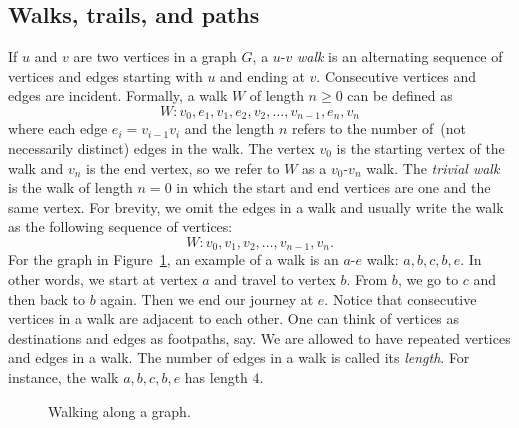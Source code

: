 
\subsection{Walks, trails, and paths}
\label{subsec:introduction:walks_trails_paths}

If $u$ and $v$ are two vertices in a graph $G$, a $u$-$v$ \emph{walk}
is an alternating sequence of vertices and edges starting with $u$ and
ending at $v$. Consecutive vertices and edges are incident. Formally,
a walk $W$ of length $n \geq 0$ can be defined as
\[
W: v_0, e_1, v_1, e_2, v_2, \dots, v_{n-1}, e_n, v_n
\]
where each edge $e_i = v_{i-1} v_i$ and the length $n$ refers to the
number of~(not necessarily distinct) edges in the walk. The vertex
$v_0$ is the starting vertex of the walk and $v_n$ is the end vertex,
so we refer to $W$ as a $v_0$-$v_n$ walk. The \emph{trivial walk} is
the walk of length $n = 0$ in which the start and end vertices are one
and the same vertex. For brevity, we omit the edges in a walk and
usually write the walk as the following sequence of vertices:
\[
W: v_0, v_1, v_2, \dots, v_{n-1}, v_n.
\]
For the graph in Figure~\ref{fig:introduction:types_of_walks}, an
example of a walk is an $a$-$e$ walk: $a, b, c, b, e$. In other words,
we start at vertex $a$ and travel to vertex $b$. From $b$, we go to
$c$ and then back to $b$ again. Then we end our journey at $e$. Notice
that consecutive vertices in a walk are adjacent to each other. One
can think of vertices as destinations and edges as footpaths, say. We
are allowed to have repeated vertices and edges in a walk. The number
of edges in a walk is called its \emph{length}. For instance, the
walk $a, b, c, b, e$ has length $4$.

\begin{figure}[!htbp]
\centering
{}
\caption{Walking along a graph.}
\label{fig:introduction:types_of_walks}
\end{figure}

